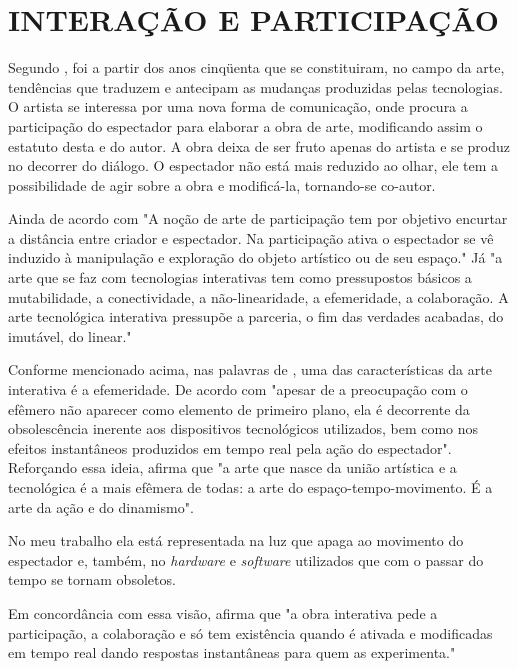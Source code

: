 \chapter{INTERAÇÃO E PARTICIPAÇÃO}

Segundo , foi a partir dos anos cinqüenta que se constituiram, no campo da arte, tendências que traduzem e antecipam as mudanças produzidas pelas tecnologias. O artista se interessa por uma nova forma de comunicação, onde procura a participação do espectador para elaborar a obra de arte, modificando assim o estatuto desta e do autor. A obra deixa de ser fruto apenas do artista e se produz no decorrer do diálogo. O espectador não está mais reduzido ao olhar, ele tem a possibilidade de agir sobre a obra e modificá-la, tornando-se co-autor. 

Ainda de acordo com  "A noção de arte de participação tem por objetivo encurtar a distância entre criador e espectador. Na participação ativa o espectador se vê induzido à manipulação e exploração do objeto artístico ou de seu espaço." Já "a arte que se faz com tecnologias interativas tem como pressupostos básicos a mutabilidade, a conectividade, a não-linearidade, a efemeridade, a colaboração. A arte tecnológica interativa pressupõe a parceria, o fim das verdades acabadas, do imutável, do linear." \cite[p.19]{domingues} 

Conforme mencionado acima, nas palavras de , uma das características da arte interativa é a efemeridade. De acordo com  "apesar de a preocupação com o efêmero não aparecer como elemento de primeiro plano, ela é decorrente da obsolescência inerente aos dispositivos tecnológicos utilizados, bem como nos efeitos instantâneos produzidos em tempo real pela ação do espectador". Reforçando essa ideia,  afirma que "a arte que nasce da união artística e a tecnológica é a mais efêmera de todas: a arte do espaço-tempo-movimento. É a arte da ação e do dinamismo".

No meu trabalho ela está representada na luz que apaga ao movimento do espectador e, também, no \textit{hardware} e \textit{software} utilizados que com o passar do tempo se tornam obsoletos. 

Em concordância com essa visão,  afirma que "a obra interativa pede a participação, a colaboração e só tem existência quando é ativada e modificadas em tempo real dando respostas instantâneas para quem as experimenta."

